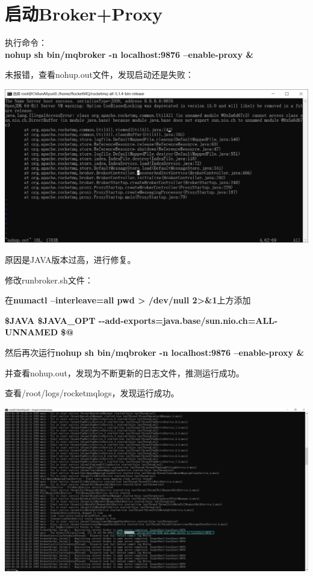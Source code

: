 \documentclass[11pt, a4paper, oneside]{ctexbook}
\let\kaishu\relax                               %
\begin{document}
\section{启动Broker+Proxy}
执行命令：\\{\bfseries\kaishu nohup sh bin/mqbroker -n localhost:9876 --enable-proxy \&}

未报错，查看nohup.out文件，发现启动还是失败：
\begin{center}
  \begin{minipage}{\textwidth}
    \center
    \includegraphics[width=\textwidth]{picture/broker启动失败.png}
    \captionsetup{hypcap=false}
    \label{fig:broker启动失败}
  \end{minipage}
\end{center}

原因是JAVA版本过高，进行修复。

修改runbroker.sh文件：

在{\bfseries\kaishu numactl --interleave=all pwd > /dev/null 2>\&1}上方添加

{\bfseries\kaishu \$JAVA \${JAVA\_OPT} {-}{-}add-exports=java.base/sun.nio.ch=ALL-UNNAMED \$@}


然后再次运行{\bfseries\kaishu nohup sh bin/mqbroker -n localhost:9876 –enable-proxy \&}

并查看nohup.out，发现为不断更新的日志文件，推测运行成功。

查看/root/logs/rocketmqlogs，发现运行成功。
\begin{center}
  \begin{minipage}{\textwidth}
    \center
    \includegraphics[width=\textwidth]{picture/broker启动成功.png}
    \captionsetup{hypcap=false}
    \label{fig:broker启动成功}
  \end{minipage}
\end{center}
\end{document}
